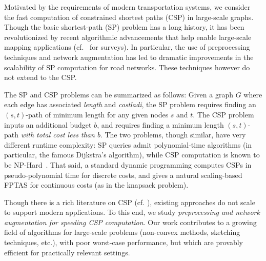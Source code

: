 Motivated by the requirements of modern transportation systems, we consider the fast computation of constrained shortest paths (CSP) in large-scale graphs. Though the basic shortest-path (SP) problem has a long history, it has been revolutionized by recent algorithmic advancements that help enable large-scale mapping applications (cf.~\cite{goldberg_survey,dimacs09} for surveys).
In particular, the use of preprocessing techniques and network augmentation has led to dramatic improvements in the scalability of SP computation for road networks.
These techniques however do not extend to the CSP.

The SP and CSP problems can be summarized as follows: Given a graph $G$ where each edge has associated \emph{length} and \emph{costladi}, the SP problem requires finding an $(s,t)$-path of minimum length for any given nodes $s$ and $t$. 
The CSP problem inputs an additional budget $b$, and requires finding a minimum length $(s,t)$-path \emph{with total cost less than $b$}.
The two problems, though similar, have very different runtime complexity: SP queries admit polynomial-time algorithms (in particular, the famous Dijkstra's algorithm), while CSP computation is known to be NP-Hard~\cite{csp_survey}.
That said, a standard dynamic programming computes CSPs in pseudo-polynomial time for discrete costs, and gives a natural scaling-based FPTAS for continuous costs (as in the knapsack problem).

Though there is a rich literature on CSP (cf. \cite{csp_survey}), existing approaches do not scale to support modern applications. 
To this end, we study \emph{preprocessing and network augmentation for speeding CSP computation}.
Our work contributes to a growing field of algorithms for large-scale problems (non-convex methods, sketching techniques, etc.), with poor worst-case performance, but which are provably efficient for practically relevant settings.

